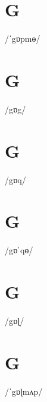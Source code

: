 \documentclass[10pt,a4paper,twoside]{book}
\begin{document}
\section*{G}

\begin{multicols}{3}
 {/ˈgɒpmɵ/} {}
\end{multicols}

\section*{G}

\begin{multicols}{3}
 {/gɒg/} {}
\end{multicols}

\section*{G}

\begin{multicols}{3}
 {/gɒq/} {}
\end{multicols}

\section*{G}

\begin{multicols}{3}
 {/gɒˈqɵ/} {}
\end{multicols}

\section*{G}

\begin{multicols}{3}
 {/gɒɭ/} {}
\end{multicols}

\section*{G}

\begin{multicols}{3}
 {/ˈgɒɭmʌp/} {}
\end{multicols}
\end{document}
